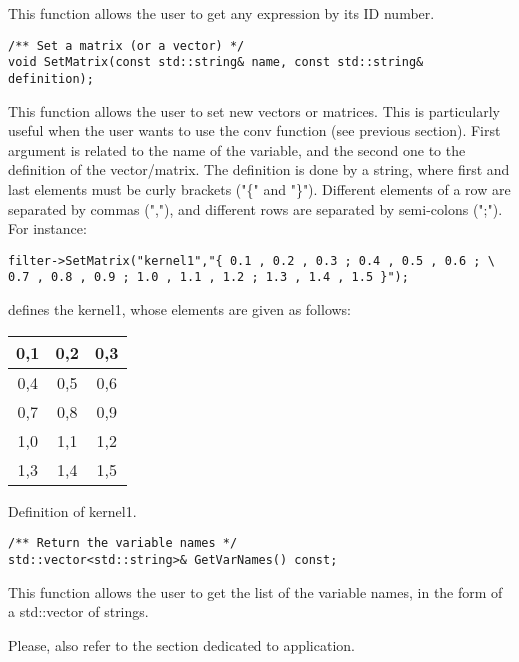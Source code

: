 This function allows the user to get any expression by its ID number.

\begin{verbatim}
/** Set a matrix (or a vector) */
void SetMatrix(const std::string& name, const std::string& definition);
\end{verbatim}

This function allows the user to set new vectors or matrices. This is particularly useful when the user wants to use the conv function (see previous section). First argument is related to the name of the variable, and the second one to the definition of the vector/matrix. The definition is done by a string, where first and last elements must be curly brackets ("\{" and "\}"). Different elements of a row are separated by commas (","), and different rows are separated by semi-colons (";"). For instance:

\begin{verbatim}
filter->SetMatrix("kernel1","{ 0.1 , 0.2 , 0.3 ; 0.4 , 0.5 , 0.6 ; \
0.7 , 0.8 , 0.9 ; 1.0 , 1.1 , 1.2 ; 1.3 , 1.4 , 1.5 }");
\end{verbatim}

defines the kernel1, whose elements are given as follows:

\begin{center} 
\begin{tabular}{|c|c|c|}
\hline
0,1	& 0,2	& 0,3 \\
\hline
0,4 &	0,5	& 0,6 \\
\hline
0,7 &	0,8	& 0,9 \\
\hline
1,0	& 1,1	& 1,2 \\
\hline
1,3	& 1,4	& 1,5 \\
\hline
\end{tabular}
\end{center}
\caption{Definition of kernel1.}
\label{correctness}


\begin{verbatim}
/** Return the variable names */
std::vector<std::string>& GetVarNames() const;
\end{verbatim}

This function allows the user to get the list of the variable names, in the form of a std::vector of strings.


\newline \newline Please, also refer to the section dedicated to  application.



